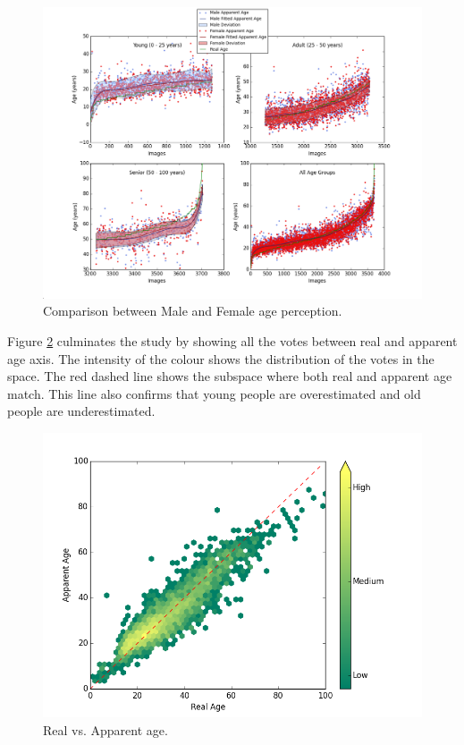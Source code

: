 \begin{figure}[h!]
	\centering
	\includegraphics[width=\textwidth]{figures/Labels_across_img_gender}
	\caption{Comparison between Male and Female age perception.}
	\label{fig:gender}
\end{figure}

Figure \ref{fig:RvsA} culminates the study by showing all the votes between real and apparent age axis. The intensity of the colour shows the distribution of the votes in the space. The red dashed line shows the subspace where both real and apparent age match. This line also confirms that young people are overestimated and old people are underestimated.

\begin{figure}[h!]
	\centering
	\includegraphics[width=\textwidth]{figures/real_vs_apparent_summer}
	\caption{Real vs. Apparent age.}
	\label{fig:RvsA}
\end{figure}

